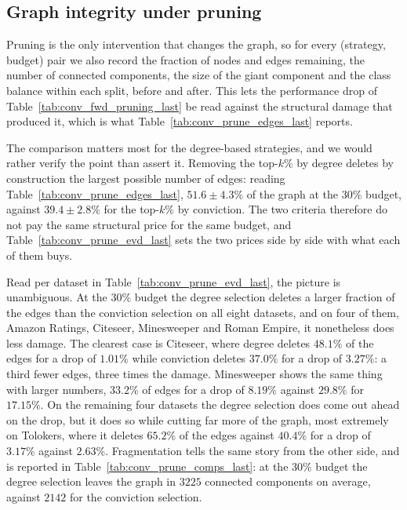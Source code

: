 



\subsection{Graph integrity under pruning}
\label{sec:supp_prune_diag}

Pruning is the only intervention that changes the graph, so for every
(strategy, budget) pair we also record the fraction of nodes and edges
remaining, the number of connected components, the size of the giant component
and the class balance within each split, before and after. This lets the
performance drop of Table~\ref{tab:conv_fwd_pruning_last} be read against the
structural damage that produced it, which is what
Table~\ref{tab:conv_prune_edges_last} reports.

The comparison matters most for the degree-based strategies, and we would rather
verify the point than assert it. Removing the top-$k\%$ by degree deletes by
construction the largest possible number of edges: reading
Table~\ref{tab:conv_prune_edges_last}, $51.6 \pm 4.3\%$ of the graph at the
$30\%$ budget, against $39.4 \pm 2.8\%$ for the top-$k\%$ by conviction.
The two criteria therefore do not pay the same structural price for the same
budget, and Table~\ref{tab:conv_prune_evd_last} sets the two prices side by side
with what each of them buys.

Read per dataset in Table~\ref{tab:conv_prune_evd_last}, the picture is
unambiguous. At the $30\%$ budget the degree
selection deletes a larger fraction of the edges than the conviction selection
on all eight datasets, and on four of them, Amazon Ratings, Citeseer,
Minesweeper and Roman Empire, it nonetheless does less damage. The clearest case
is Citeseer, where degree deletes $48.1\%$ of the edges for a drop of $1.01\%$
while conviction deletes $37.0\%$ for a drop of $3.27\%$: a third fewer edges,
three times the damage. Minesweeper shows the same thing with larger numbers,
$33.2\%$ of edges for a drop of $8.19\%$ against $29.8\%$ for $17.15\%$. On the
remaining four datasets the degree selection does come out ahead on the drop,
but it does so while cutting far more of the graph, most extremely on Tolokers,
where it deletes $65.2\%$ of the edges against $40.4\%$ for a drop of $3.17\%$
against $2.63\%$. Fragmentation tells the same story from the other side, and is
reported in Table~\ref{tab:conv_prune_comps_last}: at the $30\%$ budget the
degree selection leaves the graph in $3225$ connected components on average,
against $2142$ for the conviction selection.

